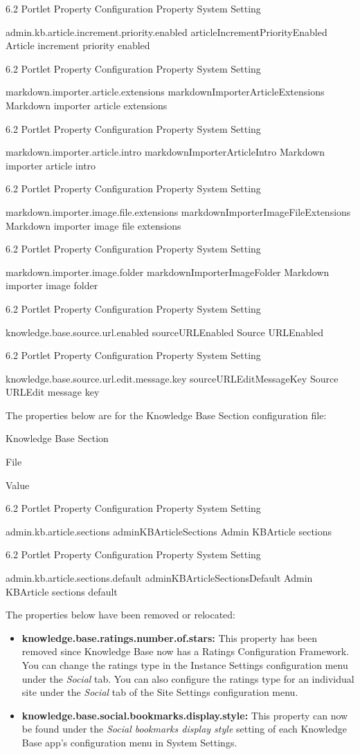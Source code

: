 6.2 Portlet Property Configuration Property System Setting

admin.kb.article.increment.priority.enabled
articleIncrementPriorityEnabled Article increment priority enabled

6.2 Portlet Property Configuration Property System Setting

markdown.importer.article.extensions markdownImporterArticleExtensions
Markdown importer article extensions

6.2 Portlet Property Configuration Property System Setting

markdown.importer.article.intro markdownImporterArticleIntro Markdown
importer article intro

6.2 Portlet Property Configuration Property System Setting

markdown.importer.image.file.extensions
markdownImporterImageFileExtensions Markdown importer image file
extensions

6.2 Portlet Property Configuration Property System Setting

markdown.importer.image.folder markdownImporterImageFolder Markdown
importer image folder

6.2 Portlet Property Configuration Property System Setting

knowledge.base.source.url.enabled sourceURLEnabled Source URLEnabled

6.2 Portlet Property Configuration Property System Setting

knowledge.base.source.url.edit.message.key sourceURLEditMessageKey
Source URLEdit message key

The properties below are for the Knowledge Base Section configuration
file:

Knowledge Base Section

File

Value

6.2 Portlet Property Configuration Property System Setting

admin.kb.article.sections adminKBArticleSections Admin KBArticle
sections

6.2 Portlet Property Configuration Property System Setting

admin.kb.article.sections.default adminKBArticleSectionsDefault Admin
KBArticle sections default

The properties below have been removed or relocated:

\begin{itemize}
\item
  \textbf{knowledge.base.ratings.number.of.stars:} This property has
  been removed since Knowledge Base now has a Ratings Configuration
  Framework. You can change the ratings type in the Instance Settings
  configuration menu under the \emph{Social} tab. You can also configure
  the ratings type for an individual site under the \emph{Social} tab of
  the Site Settings configuration menu.
\item
  \textbf{knowledge.base.social.bookmarks.display.style:} This property
  can now be found under the \emph{Social bookmarks display style}
  setting of each Knowledge Base app's configuration menu in System
  Settings.
\end{itemize}

